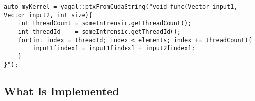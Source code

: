 \begin{lstlisting}[caption={Code showing possible construction of kernel with a string, being sent to the library, where it get extended to correct \textit{CUDA C}, before being sent to \textit{nvrtc}.}, label={code:metaBuildNvrtc}]
auto myKernel = yagal::ptxFromCudaString("void func(Vector input1, Vector input2, int size){
    int threadCount = someIntrensic.getThreadCount();
    int threadId    = someIntrensic.getThreadId();
    for(int index = threadId; index < elements; index += threadCount){
        input1[index] = input1[index] + input2[index];
    }
}");
\end{lstlisting}

\subsection{What Is Implemented}
